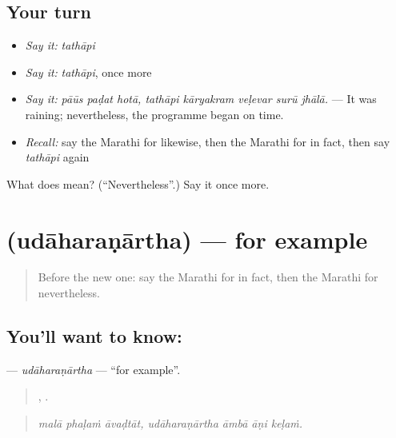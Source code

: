 \subsection*{Your turn}
\begin{itemize}
\raggedright
  \item \emph{Say it:} \emph{tathāpi}
  \item \emph{Say it:} \emph{tathāpi}, once more
  \item \emph{Say it:} \emph{pāūs paḍat hotā, tathāpi kāryakram veḷevar surū jhālā.} — It was raining; nevertheless, the programme began on time.
  \item \emph{Recall:} say the Marathi for likewise, then the Marathi for in fact, then say \emph{tathāpi} again
\end{itemize}

\begin{tcolorbox}[breakable,colback=teal!4,colframe=teal!35!black,title={Before you move on}]
What does  mean? (\textquotedblleft{}Nevertheless\textquotedblright{}.) Say it once more.
\end{tcolorbox}
\section[\texorpdfstring{\mr{उदाहरणार्थ} (udāharaṇārtha)}{उदाहरणार्थ (udāharaṇārtha)}]{ (udāharaṇārtha) — for example}

\label{lesson:MR-C351-udaharanartha}



\begin{quote}
Before the new one: say the Marathi for in fact, then the Marathi for nevertheless.
\end{quote}

\subsection*{You'll want to know: }
\textbf{} — \emph{udāharaṇārtha} — \textquotedblleft{}for example\textquotedblright{}.

\begin{quote}
  ,    .
\end{quote}

\begin{quote}
\emph{malā phaḷaṁ āvaḍtāt, udāharaṇārtha āmbā āṇi keḷaṁ.}
\end{quote}

